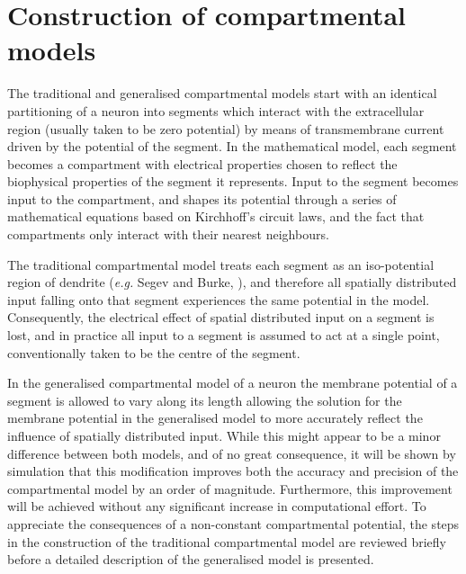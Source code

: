 \section{Construction of compartmental models}
The traditional and generalised compartmental models start with an
identical partitioning of a neuron into segments which interact
with the extracellular region (usually taken to be zero potential)
by means of transmembrane current driven by the potential of the
segment. In the mathematical model, each segment becomes a
compartment with electrical properties chosen to reflect the
biophysical properties of the segment it represents. Input to the
segment becomes input to the compartment, and shapes its potential
through a series of mathematical equations based on Kirchhoff's
circuit laws, and the fact that compartments only interact with
their nearest neighbours.

The traditional compartmental model treats each segment as an
iso-potential region of dendrite (\emph{e.g.} Segev and Burke,
\cite{Segev98}), and therefore all spatially distributed input
falling onto that segment experiences the same potential in the
model. Consequently, the electrical effect of spatial distributed
input on a segment is lost, and in practice all input to a segment
is assumed to act at a single point, conventionally taken to be
the centre of the segment.

In the generalised compartmental model of a neuron the membrane
potential of a segment is allowed to vary along its length
allowing  the solution for the membrane potential in the
generalised model to more accurately reflect the influence of
spatially distributed input. While this might appear to be a minor
difference between both models, and of no great consequence, it
will be shown by simulation that this modification improves both
the accuracy and precision of the compartmental model by an order
of magnitude. Furthermore, this improvement will be achieved
without any significant increase in computational effort. To
appreciate the consequences of a non-constant compartmental
potential, the steps in the construction of the traditional
compartmental model are reviewed briefly before a detailed
description of the generalised model is presented.

